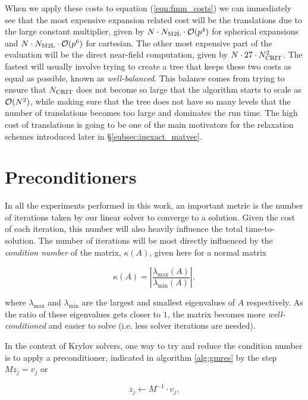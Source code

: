 When we apply these costs to equation (\ref{eqn:fmm_costs}) we can immediately see that the most expensive expansion related cost will be the {\mtol} translations due to the large constant multiplier, given by $N\cdot N_{\text{M2L}}\cdot\mathcal{O}(p^{4})$ for spherical expansions and $N\cdot N_{\text{M2L}}\cdot\mathcal{O}(p^{6})$ for cartesian. The other most expensive part of the evaluation will be the direct near-field computation, given by $N\cdot 27\cdot N_{\text{CRIT}}^{2}$. The fastest {\fmm} will usually involve trying to create a tree that keeps these two costs as equal as possible, known as \emph{well-balanced}. This balance comes from trying to ensure that $N_{\text{CRIT}}$ does not become so large that the algorithm starts to scale as $\mathcal{O}(N^{2})$, while making sure that the tree does not have so many levels that the number of {\mtol} translations becomes too large and dominates the run time. The high cost of {\mtol} translations is going to be one of the main motivators for the relaxation schemes introduced later in \S\ref{subsec:inexact_matvec}.

\section{Preconditioners}

In all the experiments performed in this work, an important metric is the number of iterations taken by our linear solver to converge to a solution. Given the cost of each iteration, this number will also heavily influence the total time-to-solution. The number of iterations will be most directly influenced by the \emph{condition number} of the matrix, $\kappa(A)$, given here for a normal matrix

\begin{equation}
	\kappa(A) = \left | \frac{\lambda_{\text{max}}(A)}{\lambda_{\text{min}}(A)} \right |,
\end{equation}

\noindent
where $\lambda_{\text{max}}$ and $\lambda_{\text{min}}$ are the largest and smallest eigenvalues of $A$ respectively. As the ratio of these eigenvalues gets closer to $1$, the matrix becomes more \emph{well-conditioned} and easier to solve (i.e. less solver iterations are needed).

In the context of Krylov solvers, one way to try and reduce the condition number is to apply a preconditioner, indicated in algorithm \ref{alg:gmres} by the step $Mz_j = v_j$ or

\begin{equation}
	z_{j} \gets M^{-1}\cdot v_{j},
\end{equation}

